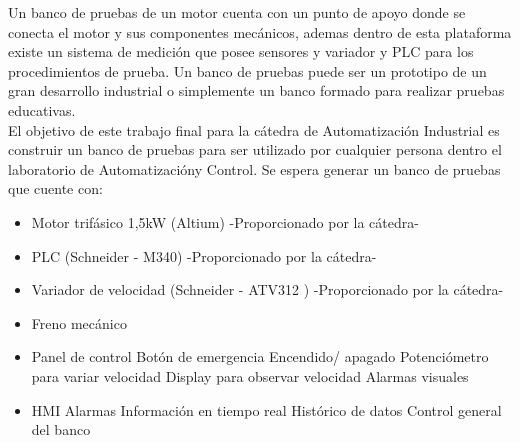 Un banco de pruebas de un motor cuenta con un punto de apoyo donde se conecta el motor y sus componentes mecánicos, ademas dentro de esta plataforma existe un sistema de medición que posee sensores y variador y PLC para los procedimientos de prueba.
Un banco de pruebas puede ser un prototipo de un gran desarrollo industrial o simplemente un banco formado para realizar pruebas educativas. \\
El objetivo de este trabajo final para la cátedra de Automatización Industrial es construir un banco de pruebas para ser utilizado por cualquier persona dentro el laboratorio de Automatizacióny Control. Se espera generar un banco de pruebas que cuente con:
\begin{itemize}
    \item Motor trifásico 1,5kW (Altium) -Proporcionado por la cátedra-
    \item PLC (Schneider - M340) -Proporcionado por la cátedra-
    \item Variador de velocidad (Schneider - ATV312 ) -Proporcionado por la cátedra-
    \item Freno mecánico
    \item Panel de control
        \subitem Botón de emergencia
        \subitem Encendido/ apagado
        \subitem Potenciómetro para variar velocidad
        \subitem Display para observar velocidad
        \subitem Alarmas visuales
    \item HMI
        \subitem Alarmas
        \subitem Información en tiempo real
        \subitem Histórico de datos
        \subitem Control general del banco
\end{itemize}

\newpage